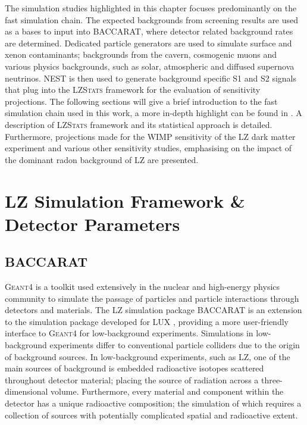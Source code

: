 The simulation studies highlighted in this chapter focuses predominantly on the fast simulation chain. The expected backgrounds from screening results are used as a bases to input into \textsc{BACCARAT}, where detector related background rates are determined. Dedicated particle generators are used to simulate surface and xenon contaminants; backgrounds from the cavern, cosmogenic muons and various physics backgrounds, such as solar, atmospheric and diffused supernova neutrinos. NEST is then used to generate background specific S1 and S2 signals that plug into the \textsc{LZStats} framework for the evaluation of sensitivity projections. The following sections will give a brief introduction to the fast simulation chain used in this work, a more in-depth highlight can be found in \cite{lz_simulations}. A description of \textsc{LZStats} framework and its statistical approach is detailed. Furthermore, projections made for the WIMP sensitivity of the LZ dark matter experiment and various other sensitivity studies, emphasising on the impact of the dominant radon background of LZ are presented.


\section{LZ Simulation Framework \& Detector Parameters}
\label{sec:LZ_simulation_framework}


\subsection{BACCARAT}
\label{secsec:BACCARAT}

\textsc{Geant4} is a toolkit used extensively in the nuclear and high-energy physics community to simulate the passage of particles and particle interactions through detectors and materials. The LZ simulation package \textsc{BACCARAT} is an extension to the simulation package developed for LUX \cite{AKERIB201263}, providing a more user-friendly interface to \textsc{Geant4} for low-background experiments. Simulations in low-background experiments differ to conventional particle colliders due to the origin of background sources. In low-background experiments, such as LZ, one of the main sources of background is embedded radioactive isotopes scattered throughout detector material; placing the source of radiation across a three-dimensional volume. Furthermore, every material and component within the detector has a unique radioactive composition; the simulation of which requires a collection of sources with potentially complicated spatial and radioactive extent.

